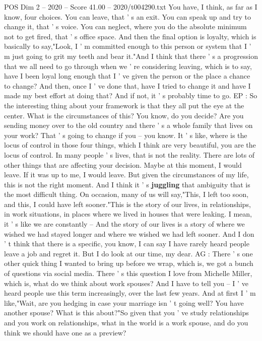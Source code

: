 \begin{textsample}{POS Dim 2 – 2020 – Score 41.00 – 2020/t004290.txt}
You have, I think, as far as I know, four choices.
You can leave, that ' s an exit.
You can speak up and try to change it, that ' s voice.
You can neglect, where you do the absolute minimum not to get fired, that ' s office space.
And then the final option is loyalty, which is basically to say,"Look, I ' m committed enough to this person or system that I ' m just going to grit my teeth and bear it."And I think that there ' s a progression that we all need to go through when we ' re considering leaving, which is to say, have I been loyal long enough that I ' ve given the person or the place a chance to change?
And then, once I ' ve done that, have I tried to change it and have I made my best effort at doing that?
And if not, it ' s probably time to go.
EP : So the interesting thing about your framework is that they all put the eye at the center.
What is the circumstances of this?
You know, do you decide?
Are you sending money over to the old country and there ' s a whole family that lives on your work?
That ' s going to change if you -- you know.
It ' s like, where is the locus of control in those four things, which I think are very beautiful, you are the locus of control.
In many people ' s lives, that is not the reality.
There are lots of other things that are affecting your decision.
Maybe at this moment, I would leave.
If it was up to me, I would leave.
But given the circumstances of my life, this is not the right moment.
And I think it ' s \textbf{juggling} that ambiguity that is the most difficult thing.
On occasion, many of us will say,"This, I left too soon, and this, I could have left sooner."This is the story of our lives, in relationships, in work situations, in places where we lived in houses that were leaking.
I mean, it ' s like we are constantly -- And the story of our lives is a story of where we wished we had stayed longer and where we wished we had left sooner.
And I don ' t think that there is a specific, you know, I can say I have rarely heard people leave a job and regret it.
But I do look at our time, my dear.
AG : There ' s one other quick thing I wanted to bring up before we wrap, which is, we got a bunch of questions via social media.
There ' s this question I love from Michelle Miller, which is, what do we think about work spouses?
And I have to tell you -- I ' ve heard people use this term increasingly, over the last few years.
And at first I ' m like,"Wait, are you hedging in case your marriage isn ' t going well?
You have another spouse?
What is this about?"So given that you ' ve study relationships and you work on relationships, what in the world is a work spouse, and do you think we should have one as a preview?

\end{textsample}

